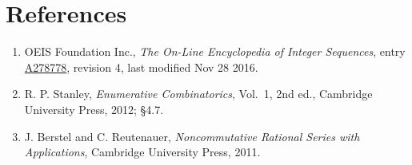 \documentclass[11pt]{article}
\theoremstyle{definition}
\begin{document}
\section{References}

\begin{enumerate}

\item OEIS Foundation Inc., \emph{The On-Line Encyclopedia of Integer Sequences}, entry \href{https://oeis.org/A278778}{A278778}, revision 4, last modified Nov 28 2016.

\item R. P. Stanley, \emph{Enumerative Combinatorics}, Vol.~1, 2nd ed., Cambridge University Press, 2012; \S4.7.

\item J. Berstel and C. Reutenauer, \emph{Noncommutative Rational Series with Applications}, Cambridge University Press, 2011.

\end{enumerate}
\end{document}
